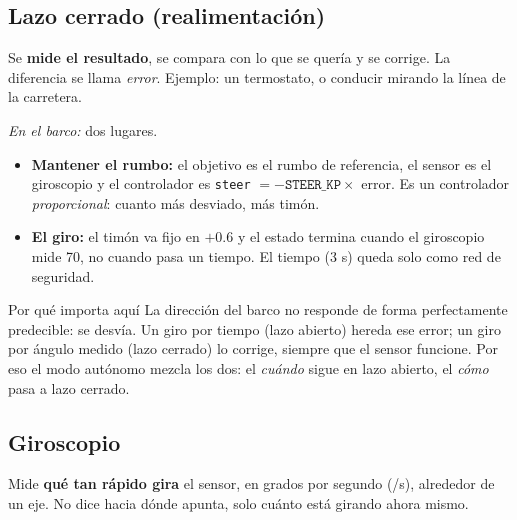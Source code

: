 \documentclass[11pt,a4paper]{article}
\newcommand{\cod}[1]{\texttt{#1}}
\begin{document}
\subsection*{Lazo cerrado (realimentaci\'on)}
Se \textbf{mide el resultado}, se compara con lo que se quer\'ia y se corrige. La diferencia se llama
\emph{error}. Ejemplo: un termostato, o conducir mirando la l\'inea de la carretera.

\begin{center}
\end{center}

\emph{En el barco:} dos lugares.
\begin{itemize}[nosep]
\item \textbf{Mantener el rumbo:} el objetivo es el rumbo de referencia, el sensor es el giroscopio y el
      controlador es \cod{steer} $=-\cod{STEER\_KP}\times$ error. Es un controlador \emph{proporcional}:
      cuanto m\'as desviado, m\'as tim\'on.
\item \textbf{El giro:} el tim\'on va fijo en $+0.6$ y el estado termina cuando el giroscopio mide 70\textdegree,
      no cuando pasa un tiempo. El tiempo (3 s) queda solo como red de seguridad.
\end{itemize}

\begin{nota}{Por qu\'e importa aqu\'i}
La direcci\'on del barco no responde de forma perfectamente predecible: se desv\'ia. Un giro por tiempo
(lazo abierto) hereda ese error; un giro por \'angulo medido (lazo cerrado) lo corrige, siempre que el
sensor funcione. Por eso el modo aut\'onomo mezcla los dos: el \emph{cu\'ando} sigue en lazo abierto, el
\emph{c\'omo} pasa a lazo cerrado.
\end{nota}

\subsection*{Giroscopio}
Mide \textbf{qu\'e tan r\'apido gira} el sensor, en grados por segundo (\textdegree/s), alrededor de un eje.
No dice hacia d\'onde apunta, solo cu\'anto est\'a girando ahora mismo.
\end{document}
